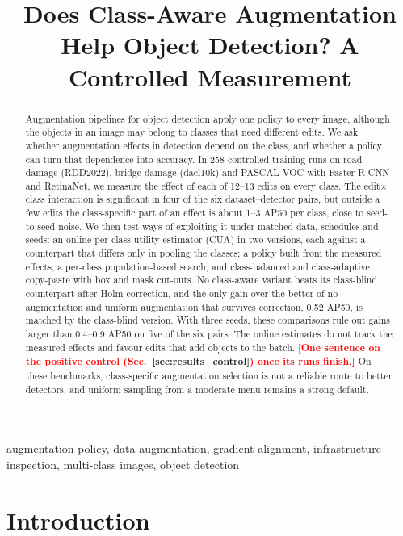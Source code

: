 \documentclass[conference]{IEEEtran}
\newcommand{\todo}[1]{\textcolor{red}{\textbf{[#1]}}}
\begin{document}
\title{Does Class-Aware Augmentation Help Object Detection? A Controlled Measurement}
\maketitle

\begin{abstract}
Augmentation pipelines for object detection apply one policy to every image, although the objects in an image may belong to classes that need different edits. We ask whether augmentation effects in detection depend on the class, and whether a policy can turn that dependence into accuracy. In 258 controlled training runs on road damage (RDD2022), bridge damage (dacl10k) and PASCAL VOC with Faster R-CNN and RetinaNet, we measure the effect of each of 12--13 edits on every class. The edit$\times$class interaction is significant in four of the six dataset--detector pairs, but outside a few edits the class-specific part of an effect is about 1--3 AP50 per class, close to seed-to-seed noise. We then test ways of exploiting it under matched data, schedules and seeds: an online per-class utility estimator (CUA) in two versions, each against a counterpart that differs only in pooling the classes; a policy built from the measured effects; a per-class population-based search; and class-balanced and class-adaptive copy-paste with box and mask cut-outs. No class-aware variant beats its class-blind counterpart after Holm correction, and the only gain over the better of no augmentation and uniform augmentation that survives correction, 0.52 AP50, is matched by the class-blind version. With three seeds, these comparisons rule out gains larger than 0.4--0.9 AP50 on five of the six pairs. The online estimates do not track the measured effects and favour edits that add objects to the batch. \todo{One sentence on the positive control (Sec.~\ref{sec:results_control}) once its runs finish.} On these benchmarks, class-specific augmentation selection is not a reliable route to better detectors, and uniform sampling from a moderate menu remains a strong default.
\end{abstract}

\begin{IEEEkeywords}
augmentation policy, data augmentation, gradient alignment, infrastructure inspection, multi-class images, object detection
\end{IEEEkeywords}

\section{Introduction}
\label{sec:intro}
\end{document}
